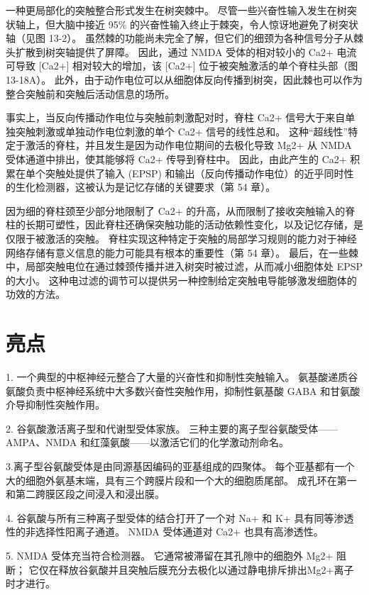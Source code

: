 一种更局部化的突触整合形式发生在树突棘中。 尽管一些兴奋性输入发生在树突状轴上，但大脑中接近 95\% 的兴奋性输入终止于棘突，令人惊讶地避免了树突状轴（见图 13-2）。 虽然棘的功能尚未完全了解，但它们的细颈为各种信号分子从棘头扩散到树突轴提供了屏障。 因此，通过 NMDA 受体的相对较小的 Ca2+ 电流可导致 [Ca2+] 相对较大的增加，该 [Ca2+] 位于被突触激活的单个脊柱头部（图 13-18A）。 此外，由于动作电位可以从细胞体反向传播到树突，因此棘也可以作为整合突触前和突触后活动信息的场所。

事实上，当反向传播动作电位与突触前刺激配对时，脊柱 Ca2+ 信号大于来自单独突触刺激或单独动作电位刺激的单个 Ca2+ 信号的线性总和。 这种“超线性”特定于激活的脊柱，并且发生是因为动作电位期间的去极化导致 Mg2+ 从 NMDA 受体通道中排出，使其能够将 Ca2+ 传导到脊柱中。 因此，由此产生的 Ca2+ 积累在单个突触处提供了输入 (EPSP) 和输出（反向传播动作电位）的近乎同时性的生化检测器，这被认为是记忆存储的关键要求（第 54 章）。

因为细的脊柱颈至少部分地限制了 Ca2+ 的升高，从而限制了接收突触输入的脊柱的长期可塑性，因此脊柱还确保突触功能的活动依赖性变化，以及记忆存储，是 仅限于被激活的突触。 脊柱实现这种特定于突触的局部学习规则的能力对于神经网络存储有意义信息的能力可能具有根本的重要性（第 54 章）。 最后，在一些棘中，局部突触电位在通过棘颈传播并进入树突时被过滤，从而减小细胞体处 EPSP 的大小。 这种电过滤的调节可以提供另一种控制给定突触电导能够激发细胞体的功效的方法。



\section{亮点}

1. 一个典型的中枢神经元整合了大量的兴奋性和抑制性突触输入。 氨基酸递质谷氨酸负责中枢神经系统中大多数兴奋性突触作用，抑制性氨基酸 GABA 和甘氨酸介导抑制性突触作用。 

2. 谷氨酸激活离子型和代谢型受体家族。 三种主要的离子型谷氨酸受体——AMPA、NMDA 和红藻氨酸——以激活它们的化学激动剂命名。 

3.离子型谷氨酸受体是由同源基因编码的亚基组成的四聚体。 每个亚基都有一个大的细胞外氨基末端，具有三个跨膜片段和一个大的细胞质尾部。 成孔环在第一和第二跨膜区段之间浸入和浸出膜。 

4. 谷氨酸与所有三种离子型受体的结合打开了一个对 Na+ 和 K+ 具有同等渗透性的非选择性阳离子通道。 NMDA 受体通道对 Ca2+ 也具有高渗透性。 

5. NMDA 受体充当符合检测器。 它通常被滞留在其孔隙中的细胞外 Mg2+ 阻断； 它仅在释放谷氨酸并且突触后膜充分去极化以通过静电排斥排出Mg2+离子时才进行。 

